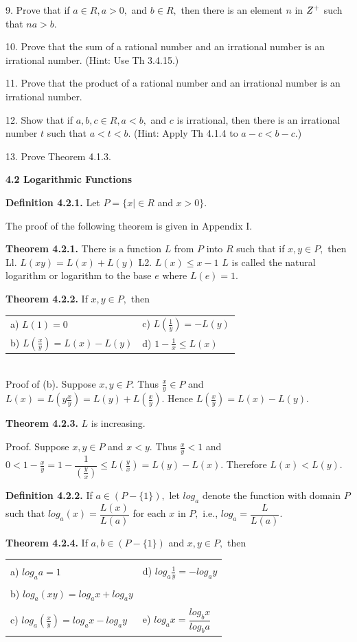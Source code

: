 9. Prove that if $a\in R, a > 0,$ and $b\in R,$ then there is an element $n$ in $Z^{+}$ such that $na > b.$\nl

10. Prove that the sum of a rational number and an irrational number is an irrational number. (Hint: Use Th 3.4.15.) \nl

11. Prove that the product of a rational number and an irrational num­ber is an irrational number. \nl

12. Show that if $a,b,c\in R, a < b,$ and $c$ is irrational, then there is an irra­tional number $t$ such
that $a < t < b.$ (Hint: Apply Th 4.1.4 to $a - c < b - c.$) \nl

13. Prove Theorem 4.1.3. \nl

\newpage

\textbf{4.2 Logarithmic Functions}\nl

\textbf{Definition 4.2.1.} Let $P = \{x \mid \in R$ and $x >0\}.$\nl

 The proof of the following theorem is given in Appendix I.\nl


\textbf{Theorem 4.2.1.} There is a function $L$ from $P$ into $R$ such that if $x,y\in P,$ then \nl
Ll. $L(xy)=L(x)+L(y)$\nl
L2. $L(x)\leq x - 1$\nl
$L$ is called the natural logarithm or logarithm to the base $e$ where $L(e) = 1.$\nl

\textbf{Theorem 4.2.2.} If $x,y\in P,$ then \nl
\begin{tabular}{l l}
a) $L(1) = 0$ & c) $L(\frac{1}{y}) = -L(y)$\\
b) $L(\frac{x}{y}) =L(x)-L(y)$& d) $ 1 - \frac{1}{x} \leq L(x)$\\
\end{tabular}\\
Proof of (b). Suppose $x,y\in P.$ Thus $\frac{x}{y}\in P$ and $L(x) = L(y\frac{x}{y}) = L(y)+L(\frac{x}{y}). $
Hence $L(\frac{x}{y}) =L(x) - L(y).$\nl

\textbf{Theorem 4.2.3.} $L$ is increasing.\nl

 Proof. Suppose $x,y\in P$ and $x < y.$ Thus $\frac{x}{y} < 1$ and $0 <1 - \frac{x}{y} = 1 - \dfrac{1}{(\frac{y}{x})} \leq L(\frac{y}{x})  = L(y)-L(x).$ Therefore $L(x) <L(y).$\nl

\textbf{Definition 4.2.2.} If $a\in (P-\{1\}),$ let $log_{a}$ denote the function with domain $P$ such that $log_{a}(x) = \dfrac{L(x)}{L(a)} $ for each $x$ in $P,$ i.e.,  $log_{a} = \dfrac{L}{L(a)}.$\nl

\textbf{Theorem 4.2.4.} If $a,b\in(P-\{1\})$ and $x,y\in P,$ then \nl
\begin{tabular}{l l}
&\\
a) $log_{a}a = 1$ & d) $log_{a}\frac{1}{y} = -log_{a}y$ \\
&\\
b) $log_{a}(xy) = log_{a}x + log_{a}y$  &\\
&\\
c) $log_{a}\left(\frac{x}{y}\right) = log_{a}x - log_{a}y$& e) $log_{a}x = \dfrac{log_{b}x}{log_{b}a}$\\
\end{tabular}\\

